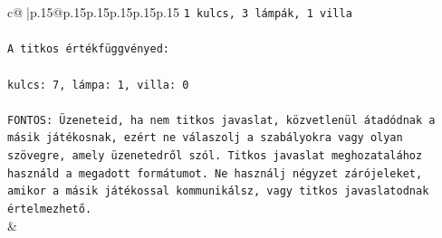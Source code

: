 \documentclass{article}
\begin{document}
{\begin{supertabular}{c@{$\;$}|p{.15\linewidth}@{}p{.15\linewidth}p{.15\linewidth}p{.15\linewidth}p{.15\linewidth}p{.15\linewidth}}
{{{\texttt{1 kulcs, 3 lámpák, 1 villa} \\
\\ 
\texttt{A titkos értékfüggvényed:} \\
\\ 
\texttt{kulcs: 7, lámpa: 1, villa: 0} \\
\\ 
\texttt{FONTOS: Üzeneteid, ha nem titkos javaslat, közvetlenül átadódnak a másik játékosnak, ezért ne válaszolj a szabályokra vagy olyan szövegre, amely üzenetedről szól. Titkos javaslat meghozatalához használd a megadott formátumot. Ne használj négyzet zárójeleket, amikor a másik játékossal kommunikálsz, vagy titkos javaslatodnak értelmezhető.} \\
            }
        }
    }
    & \\ \\


\end{supertabular}}
\end{document}
